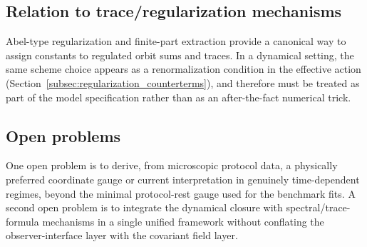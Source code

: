 \subsection{Relation to trace/regularization mechanisms}
\label{subsec:trace_relation}

Abel-type regularization and finite-part extraction provide a canonical way to assign constants to regulated orbit sums and traces.
In a dynamical setting, the same scheme choice appears as a renormalization condition in the effective action (Section~\ref{subsec:regularization_counterterms}), and therefore must be treated as part of the model specification rather than as an after-the-fact numerical trick.

\subsection{Open problems}
\label{subsec:open_problems}

One open problem is to derive, from microscopic protocol data, a physically preferred coordinate gauge or current interpretation in genuinely time-dependent regimes, beyond the minimal protocol-rest gauge used for the benchmark fits.
A second open problem is to integrate the dynamical closure with spectral/trace-formula mechanisms in a single unified framework without conflating the observer-interface layer with the covariant field layer.


